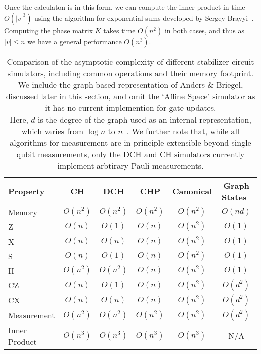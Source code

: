 Once the calculaton is in this form, we can compute the inner product in time $O(\vert v\vert^{3})$ using the algorithm for exponential sums developed by Sergey Brayyi~\cite{Bravyi2018}. Computing the phase matrix $K$ takes time $O(n^{2})$ in both cases, and thus as $\vert v\vert\leq n$ we have a general performance $O(n^{3})$.
\begin{table}[t]
\centering
\begin{tabular}{|l|c|c|c|c|c|}
\hline
Property & CH & DCH & CHP & Canonical & Graph States~\cite{Anders2006} \\
\hline
Memory & $O(n^{2})$ & $O(n^{2})$ & $O(n^{2})$ & $O(n^{2})$ & $O(nd)$\\
\hline
Z & $O(n)$ & $O(1)$ & $O(n)$ & $O(n^{2})$ & $O(1)$\\
X & $O(n)$ & $O(n)$ & $O(n)$ & $O(n^{2})$ & $O(1)$\\
S & $O(n)$ & $O(1)$ & $O(n)$ & $O(n^{2})$ & $O(1)$\\
H & $O(n^{2})$ & $O(n^{2})$ & $O(n)$ & $O(n^{2})$ & $O(1)$\\
CZ & $O(n)$ & $O(1)$ & $O(n)$ & $O(n^{2})$ & $O(d^{2})$\\
CX & $O(n)$ & $O(n)$ & $O(n)$ & $O(n^{2})$ & $O(d^{2})$\\
Measurement & $O(n^{2})$ & $O(n^{2})$ & $O(n^{2})$ & $O(n^{2})$ & $O(d^{2})$\\
Inner Product & $O(n^{3})$ & $O(n^{3})$ & $O(n^{3})$ & $O(n^{3})$ & N/A \\
\hline
\end{tabular}
\caption{Comparison of the asymptotic complexity of different stabilizer circuit simulators, including common operations and their memory footprint. We include the graph based representation of Anders \& Briegel, discussed later in this section, and omit the `Affine Space' simulator as it has no current implemention for gate updates.\\ Here, $d$ is the degree of the graph used as an internal representation, which varies from $\log{n}$ to $n$~\cite{Anders2006}. We further note that, while all algorithms for measurement are in principle extensible beyond single qubit measurements, only the DCH and CH simulators currently implement arbtirary Pauli measurements.}
\label{tab:comparison}
\end{table}
